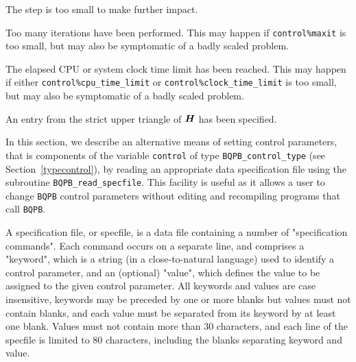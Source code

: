 \documentclass{galahad}
\newcommand{\packagename}{BQPB}
\begin{document}
\begin{description}
 The step is too small to make further impact.

 Too many iterations have been performed.
   This may happen if
    {\tt control\%maxit} is too small, but may also be symptomatic of
    a badly scaled problem.

 The elapsed CPU or system clock time limit has been
    reached. This may happen if either {\tt control\%cpu\_time\_limit} or
    {\tt control\%clock\_time\_limit} is too small, but may also be symptomatic
    of a badly scaled problem.

 An entry from the strict upper triangle of ${\bm{H}}$
 has been specified.

\end{description}


\galfeatures
\noindent In this section, we describe an alternative means of setting
control parameters, that is components of the variable {\tt control} of type
{\tt \packagename\_control\_type}
(see Section~\ref{typecontrol}),
by reading an appropriate data specification file using the
subroutine {\tt \packagename\_read\_specfile}. This facility
is useful as it allows a user to change  {\tt \packagename} control parameters
without editing and recompiling programs that call {\tt \packagename}.

A specification file, or specfile, is a data file containing a number of
"specification commands". Each command occurs on a separate line,
and comprises a "keyword",
which is a string (in a close-to-natural language) used to identify a
control parameter, and
an (optional) "value", which defines the value to be assigned to the given
control parameter. All keywords and values are case insensitive,
keywords may be preceded by one or more blanks but
values must not contain blanks, and
each value must be separated from its keyword by at least one blank.
Values must not contain more than 30 characters, and
each line of the specfile is limited to 80 characters,
including the blanks separating keyword and value.
\end{document}

